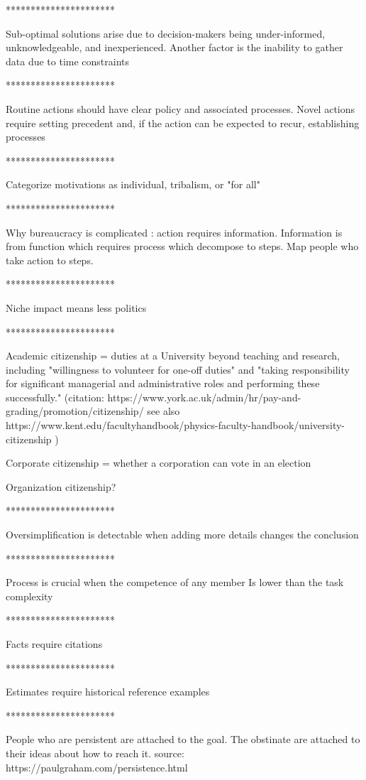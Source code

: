 **********************

Sub-optimal solutions arise due to decision-makers being under-informed, unknowledgeable, and inexperienced. Another factor is the inability to gather data due to time constraints

**********************

Routine actions should have clear policy and associated processes. Novel actions require setting precedent and, if the action can be expected to recur, establishing processes 

**********************

Categorize motivations as individual, tribalism, or "for all"

**********************


Why bureaucracy is complicated : action requires information. Information is from function which requires process which decompose to steps. Map people who take action to steps.

**********************

Niche impact means less politics

**********************

Academic citizenship = duties at a University beyond teaching and research, including "willingness to volunteer for one-off duties" and "taking responsibility for significant managerial and administrative roles and performing these successfully." 
(citation: https://www.york.ac.uk/admin/hr/pay-and-grading/promotion/citizenship/
see also   https://www.kent.edu/facultyhandbook/physics-faculty-handbook/university-citizenship
)

Corporate citizenship = whether a corporation can vote in an election

Organization citizenship?

**********************

Oversimplification is detectable when adding more details changes the conclusion 

**********************

Process is crucial when the competence of any member Is lower than the task complexity

**********************

Facts require citations 

**********************

Estimates require historical reference examples

**********************

People who are persistent are attached to the goal. The obstinate are attached to their ideas about how to reach it.
source: https://paulgraham.com/persistence.html

